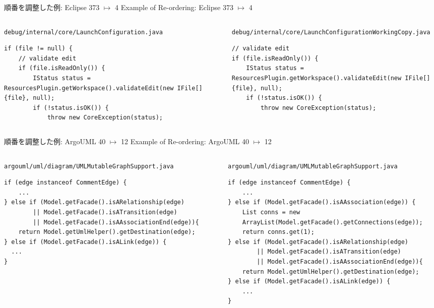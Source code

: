 \begin{frame}[fragile]{順番を調整した例: Eclipse 373 $\mapsto$ 4}
{Example of Re-ordering: Eclipse 373 $\mapsto$ 4}
\begin{columns}
\begin{column}{12em}
\texttt{\tiny debug/internal/core/LaunchConfiguration.java }
\begin{lstlisting}[firstnumber=253]
if (file != null) { 
    // validate edit 
    if (file.isReadOnly()) { 
        IStatus status = ResourcesPlugin.getWorkspace().validateEdit(new IFile[] {file}, null); 
        if (!status.isOK()) { 
            throw new CoreException(status); 
\end{lstlisting}
\end{column}
\begin{column}{12em}
\texttt{\tiny debug/internal/core/LaunchConfigurationWorkingCopy.java}
\begin{lstlisting}[firstnumber=311]
// validate edit
if (file.isReadOnly()) {
    IStatus status = ResourcesPlugin.getWorkspace().validateEdit(new IFile[] {file}, null);
    if (!status.isOK()) {
        throw new CoreException(status);
\end{lstlisting}
\end{column}
\end{columns}
\end{frame}
\begin{frame}[fragile]{順番を調整した例: ArgoUML 40 $\mapsto$ 12}
{Example of Re-ordering: ArgoUML 40 $\mapsto$ 12}
\begin{columns}
\begin{column}{12em}
\texttt{\tiny argouml/uml/diagram/UMLMutableGraphSupport.java}
\begin{lstlisting}[firstnumber=331]
if (edge instanceof CommentEdge) { 
    ... 
} else if (Model.getFacade().isARelationship(edge) 
        || Model.getFacade().isATransition(edge) 
        || Model.getFacade().isAAssociationEnd(edge)){ 
    return Model.getUmlHelper().getDestination(edge); 
} else if (Model.getFacade().isALink(edge)) { 
  ...
} 
\end{lstlisting}
\end{column}
\begin{column}{12em}
\texttt{\tiny argouml/uml/diagram/UMLMutableGraphSupport.java}
\begin{lstlisting}[firstnumber=360]
if (edge instanceof CommentEdge) {
    ...
} else if (Model.getFacade().isAAssociation(edge)) {
    List conns = new
    ArrayList(Model.getFacade().getConnections(edge));
    return conns.get(1);
} else if (Model.getFacade().isARelationship(edge)
        || Model.getFacade().isATransition(edge)
        || Model.getFacade().isAAssociationEnd(edge)){
    return Model.getUmlHelper().getDestination(edge);
} else if (Model.getFacade().isALink(edge)) {
    ...
}
\end{lstlisting}
\end{column}
\end{columns}
\end{frame}

